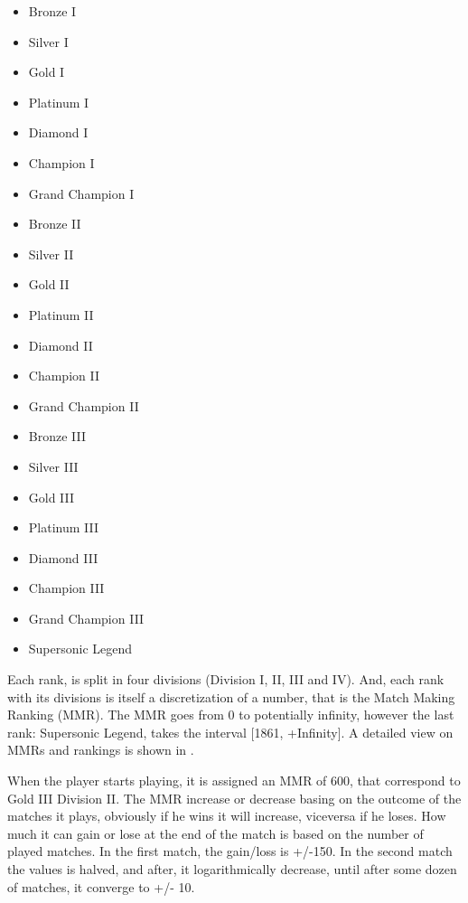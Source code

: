 \begin{multicols}{3}
    \begin{itemize}
        \item Bronze I
        \item Silver I
        \item Gold I
        \item Platinum I      
        \item Diamond I        
        \item Champion I         
        \item Grand Champion I    
        \item Bronze II
        \item Silver II
        \item Gold II       
        \item Platinum II     
        \item Diamond  II         
        \item Champion II         
        \item Grand Champion II
        \item Bronze III
        \item Silver III
        \item Gold III    
        \item Platinum III     
        \item Diamond  III        
        \item Champion III         
        \item Grand Champion III
    \end{itemize}
\end{multicols}

\begin{itemize}
    \item Supersonic Legend
\end{itemize}

Each rank, is split in four divisions (Division I, II, III and IV). And, each rank with its divisions is itself a discretization of a number, that is the Match Making Ranking (MMR). 
The MMR goes from 0 to potentially infinity, however the last rank: Supersonic Legend, takes the interval [1861, +Infinity]. A detailed view on MMRs and rankings is shown in .

When the player starts playing, it is assigned an MMR of 600, that correspond to Gold III Division II. The MMR increase or decrease basing on the outcome of the matches it plays, obviously if he wins it will increase, viceversa if he loses. How much it can gain or lose at the end of the match is based on the number of played matches. In the first match, the gain/loss is +/-150. In the second match the values is halved, and after, it logarithmically decrease, until after some dozen of matches, it converge to +/- 10.

